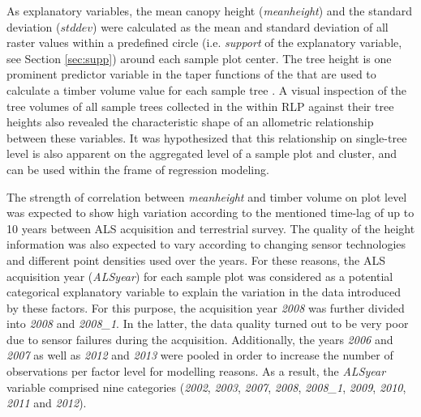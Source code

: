 As explanatory variables, the mean canopy height (\textit{meanheight}) and the standard deviation ($stddev$) were calculated as the mean and standard deviation of all raster values within a predefined circle (i.e. \textit{support} of the explanatory variable, see Section \ref{sec:supp}) around each sample plot center.  The tree height is one prominent predictor variable in the taper functions of the \bwi{} that are used to calculate a timber volume value for each sample tree \citep{kublin2003, kublin2013}. A visual inspection of the tree volumes of all sample trees collected in the \bwi{} within RLP against their tree heights also revealed the characteristic shape of an allometric relationship between these variables. It was hypothesized that this relationship on single-tree level is also apparent on the aggregated level of a sample plot and cluster, and can be used within the frame of regression modeling.\par
The strength of correlation between \textit{meanheight} and timber volume on plot level was expected to show high variation according to the mentioned time-lag of up to 10 years between ALS acquisition and terrestrial survey. The quality of the height information was also expected to vary according to changing sensor technologies and different point densities used over the years. For these reasons, the ALS acquisition year (\textit{ALSyear}) for each sample plot was considered as a potential categorical explanatory variable to explain the variation in the data introduced by these factors. For this purpose, the acquisition year \textit{2008} was further divided into \textit{2008} and \textit{2008\_1}. In the latter, the data quality turned out to be very poor due to sensor failures during the acquisition. Additionally, the years \textit{2006} and \textit{2007} as well as \textit{2012} and \textit{2013} were pooled in order to increase the number of observations per factor level for modelling reasons. As a result, the \textit{ALSyear} variable comprised nine categories (\textit{2002}, \textit{2003}, \textit{2007}, \textit{2008}, \textit{2008\_1}, \textit{2009}, \textit{2010}, \textit{2011} and \textit{2012}).

